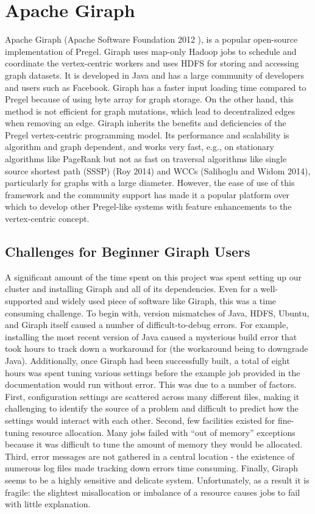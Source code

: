 \section{Apache Giraph}
\label{sec:giraph}

Apache Giraph (Apache Software Foundation 2012 \cite{ApacheGiraph}), is a 
popular open-source implementation of
Pregel. Giraph uses map-only Hadoop jobs to schedule and coordinate the 
vertex-centric workers and uses HDFS for storing and accessing graph datasets. 
It is developed in Java and has a large community of developers and 
users such as Facebook\cite{GiraphAtFacebook}. 
Giraph has a faster input loading time compared to Pregel 
because of using byte array for graph storage. On the other hand, this method 
is not efficient for graph mutations, which lead to decentralized edges when removing an edge. 
Giraph inherits the benefits and deficiencies of the Pregel vertex-centric
programming model. Its performance and scalability is algorithm and graph dependent, 
and works very fast, e.g., on stationary algorithms like PageRank but not as fast on 
traversal algorithms like single source shortest path (SSSP) (Roy 2014) and 
WCCs 
(Salihoglu and Widom 2014), particularly for graphs with a large diameter. 
However, the ease of use of this framework and the community support has made it a 
popular platform over which to develop other Pregel-like systems with feature enhancements 
to the vertex-centric concept.

\subsection{Challenges for Beginner Giraph Users}

A significant amount of the time spent on this project was spent setting up our 
cluster and installing Giraph and all of its dependencies. Even for a 
well-supported and widely used piece of software like Giraph, this was a time 
consuming challenge. To begin with, version mismatches of Java, HDFS, Ubuntu, 
and Giraph itself caused a number of difficult-to-debug errors. For example, 
installing the most recent version of Java caused a mysterious build error that 
took hours to track down a workaround for (the workaround being to downgrade 
Java). Additionally, once Giraph had been successfully built, a total of eight 
hours was spent tuning various settings before the example job provided in the 
documentation would run without error. This was due to a number of factors. 
First, configuration settings are scattered across many different files, making 
it challenging to identify the source of a problem and difficult to predict how 
the settings would interact with each other. Second, few facilities existed for 
fine-tuning resource allocation. Many jobs failed with ``out of memory'' 
exceptions because it was difficult to tune the amount of memory they would be 
allocated. Third, error messages are not gathered in a central location - the 
existence of numerous log files made tracking down errors time consuming. 
Finally, Giraph seems to be a highly sensitive and delicate system. 
Unfortunately, as a result it is fragile: the slightest misallocation or 
imbalance of a resource causes jobs to fail with little explanation.

